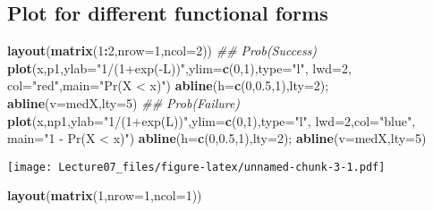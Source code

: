 \documentclass[
]{article}
\newenvironment{Shaded}{\begin{snugshade}}{\end{snugshade}}
\newcommand{\CommentTok}[1]{\textcolor[rgb]{0.56,0.35,0.01}{\textit{#1}}}
\newcommand{\DataTypeTok}[1]{\textcolor[rgb]{0.13,0.29,0.53}{#1}}
\newcommand{\DecValTok}[1]{\textcolor[rgb]{0.00,0.00,0.81}{#1}}
\newcommand{\FloatTok}[1]{\textcolor[rgb]{0.00,0.00,0.81}{#1}}
\newcommand{\KeywordTok}[1]{\textcolor[rgb]{0.13,0.29,0.53}{\textbf{#1}}}
\newcommand{\NormalTok}[1]{#1}
\newcommand{\OperatorTok}[1]{\textcolor[rgb]{0.81,0.36,0.00}{\textbf{#1}}}
\newcommand{\StringTok}[1]{\textcolor[rgb]{0.31,0.60,0.02}{#1}}
\begin{document}
\hypertarget{plot-for-different-functional-forms}{%
\subsection{Plot for different functional
forms}\label{plot-for-different-functional-forms}}

\begin{Shaded}
\begin{Highlighting}[]
\KeywordTok{layout}\NormalTok{(}\KeywordTok{matrix}\NormalTok{(}\DecValTok{1}\OperatorTok{:}\DecValTok{2}\NormalTok{,}\DataTypeTok{nrow=}\DecValTok{1}\NormalTok{,}\DataTypeTok{ncol=}\DecValTok{2}\NormalTok{))}
  \CommentTok{## Prob(Success)}
  \KeywordTok{plot}\NormalTok{(x,p1,}\DataTypeTok{ylab=}\StringTok{"1/(1+exp(-L))"}\NormalTok{,}\DataTypeTok{ylim=}\KeywordTok{c}\NormalTok{(}\DecValTok{0}\NormalTok{,}\DecValTok{1}\NormalTok{),}\DataTypeTok{type=}\StringTok{"l"}\NormalTok{, }\DataTypeTok{lwd=}\DecValTok{2}\NormalTok{, }\DataTypeTok{col=}\StringTok{"red"}\NormalTok{,}\DataTypeTok{main=}\StringTok{"Pr(X < x)"}\NormalTok{)}
  \KeywordTok{abline}\NormalTok{(}\DataTypeTok{h=}\KeywordTok{c}\NormalTok{(}\DecValTok{0}\NormalTok{,}\FloatTok{0.5}\NormalTok{,}\DecValTok{1}\NormalTok{),}\DataTypeTok{lty=}\DecValTok{2}\NormalTok{); }\KeywordTok{abline}\NormalTok{(}\DataTypeTok{v=}\NormalTok{medX,}\DataTypeTok{lty=}\DecValTok{5}\NormalTok{)}
  \CommentTok{## Prob(Failure)}
  \KeywordTok{plot}\NormalTok{(x,np1,}\DataTypeTok{ylab=}\StringTok{"1/(1+exp(L))"}\NormalTok{,}\DataTypeTok{ylim=}\KeywordTok{c}\NormalTok{(}\DecValTok{0}\NormalTok{,}\DecValTok{1}\NormalTok{),}\DataTypeTok{type=}\StringTok{"l"}\NormalTok{, }\DataTypeTok{lwd=}\DecValTok{2}\NormalTok{,}\DataTypeTok{col=}\StringTok{"blue"}\NormalTok{, }\DataTypeTok{main=}\StringTok{"1 - Pr(X < x)"}\NormalTok{)}
  \KeywordTok{abline}\NormalTok{(}\DataTypeTok{h=}\KeywordTok{c}\NormalTok{(}\DecValTok{0}\NormalTok{,}\FloatTok{0.5}\NormalTok{,}\DecValTok{1}\NormalTok{),}\DataTypeTok{lty=}\DecValTok{2}\NormalTok{); }\KeywordTok{abline}\NormalTok{(}\DataTypeTok{v=}\NormalTok{medX,}\DataTypeTok{lty=}\DecValTok{5}\NormalTok{)}
\end{Highlighting}
\end{Shaded}

\texttt{[image: Lecture07\_files/figure-latex/unnamed-chunk-3-1.pdf]}

\begin{Shaded}
\begin{Highlighting}[]
\KeywordTok{layout}\NormalTok{(}\KeywordTok{matrix}\NormalTok{(}\DecValTok{1}\NormalTok{,}\DataTypeTok{nrow=}\DecValTok{1}\NormalTok{,}\DataTypeTok{ncol=}\DecValTok{1}\NormalTok{))}
\end{Highlighting}
\end{Shaded}
\end{document}

